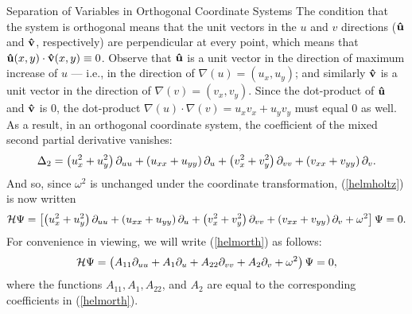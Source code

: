 \begin{section}{Separation of Variables in Orthogonal Coordinate Systems}
The condition that the system is orthogonal means that the unit vectors in the $u$ and $v$ directions ($\mathbf{\hat{u}}$ and $\mathbf{\hat{v}}$, respectively) are perpendicular at every point, which means that $\mathbf{\hat{u}}(x,y) \cdot \mathbf{\hat{v}}(x,y) \equiv 0$.  Observe that $\mathbf{\hat{u}}$ is a unit vector in the direction of maximum increase of $u$ --- i.e., in the direction of $\nabla (u) = (u_x, u_y)$; and similarly $\mathbf{\hat{v}}$ is a unit vector in the direction of $\nabla (v) = (v_x, v_y)$.  Since the dot-product of $\mathbf{\hat{u}}$ and $\mathbf{\hat{v}}$ is $0$, the dot-product $\nabla (u) \cdot \nabla (v) = u_x v_x + u_y v_y$ must equal $0$ as well.  As a result, in an orthogonal coordinate system, the coefficient of the mixed second partial derivative vanishes:
\begin{equation}
\label{laplacorth}
\Delta_2 = \left( u_x^2 + u_y^2 \right) \partial_{u u} + \left( u_{xx} + u_{yy} \right) \partial_{u} + \left( v_x^2 + v_y^2 \right) \partial_{v v} + \left( v_{xx} + v_{yy} \right) \partial_{v} .
\end{equation}
And so, since $\omega^2$ is unchanged under the coordinate transformation, (\ref{helmholtz}) is now written
\begin{equation}
\label{helmorth}
\mathcal{H} \Psi = \left[ \left( u_x^2 + u_y^2 \right) \partial_{u u} + \left( u_{xx} + u_{yy} \right) \partial_{u} + \left( v_x^2 + v_y^2 \right) \partial_{v v} + \left( v_{xx} + v_{yy} \right) \partial_{v} + \omega^2 \right] \Psi = 0.
\end{equation}
For convenience in viewing, we will write (\ref{helmorth}) as follows:
\begin{equation}
\label{helmabbrev}
\mathcal{H} \Psi = \left( A_{11} \partial_{u u} + A_1 \partial_{u} + A_{22} \partial_{v v} + A_2 \partial_{v} + \omega^2 \right) \Psi = 0,
\end{equation}
where the functions $A_{11}, A_1, A_{22}$, and $A_2$ are equal to the corresponding coefficients in (\ref{helmorth}).


\end{section}
